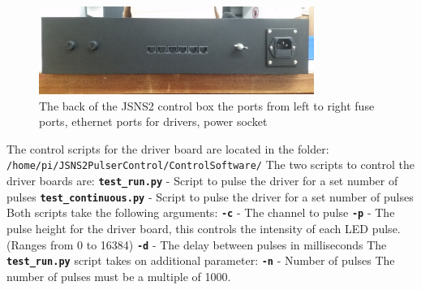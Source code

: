 \documentclass[11pt, a4paper, oneside ]{article}
\begin{document}
\begin{figure}[H]
    \centering
    \includegraphics[width=0.8\textwidth]{figures/BoxBack.jpg}
    \caption{The back of the JSNS2 control box the ports from left to right fuse ports, ethernet ports for drivers, power socket}
    \label{fig:boxBack}
\end{figure}

\noindent The control scripts for the driver board are located in the folder: \newline\newline \texttt{/home/pi/JSNS2PulserControl/ControlSoftware/} \newline
\newline
\noindent The two scripts to control the driver boards are:
\newline
\newline
\texttt{\textbf{test\_run.py}} - Script to pulse the driver for a set number of pulses
\newline
\newline
\texttt{\textbf{test\_continuous.py}} - Script to pulse the driver for a set number of pulses
\newline
\newline
Both scripts take the following arguments:
\newline
\newline
\texttt{\textbf{-c}} - The channel to pulse \newline
\texttt{\textbf{-p}} - The pulse height for the driver board, this controls the intensity of each LED pulse. (Ranges from 0 to 16384)\newline
\texttt{\textbf{-d}} - The delay between pulses in milliseconds \newline
\newline
The \texttt{\textbf{test\_run.py}} script takes on additional parameter:
\newline
\newline
\texttt{\textbf{-n}} - Number of pulses\newline
\newline
\newline
The number of pulses must be a multiple of 1000.
\end{document}
